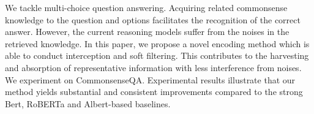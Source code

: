We tackle multi-choice question answering. Acquiring related commonsense knowledge to the question and options facilitates the recognition of the correct answer. However, the current reasoning models suffer from the noises in the retrieved knowledge. In this paper, we propose a novel encoding method which is able to conduct interception and soft filtering. This contributes to the harvesting and absorption of representative information with less interference from noises. We experiment on CommonsenseQA. Experimental results illustrate that our method yields substantial and consistent improvements compared to the strong Bert, RoBERTa and Albert-based baselines.

